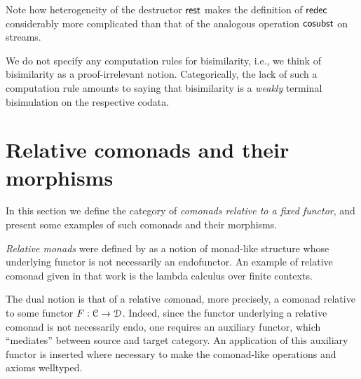 \documentclass[a4paper,USenglish]{lipics}
\begin{document}
\begin{Long}
Note how heterogeneity of the destructor $\mathsf{rest}$ makes the definition of $\mathsf{redec}$ considerably more complicated than that of
the analogous operation $\mathsf{cosubst}$ on streams.
\end{Long}

\begin{rem}
 We do not specify any computation rules for bisimilarity, i.e., we think of bisimilarity as a proof-irrelevant notion. 
 Categorically, the lack of such a computation rule amounts to saying that bisimilarity is a \emph{weakly} terminal bisimulation on the respective codata. 
\end{rem}


  
\section{Relative comonads and their morphisms}\label{sec:comonads}

In this section we define the category of \emph{comonads relative to a fixed functor}, and present some examples 
of such comonads and their morphisms.

\emph{Relative monads} were defined by \textcite{DBLP:conf/fossacs/AltenkirchCU10} as a notion of monad-like structure
whose underlying functor is not necessarily an endofunctor. 
An example of relative comonad given in that work is the lambda calculus over finite contexts.


The dual notion is that of a relative \emph{co}monad, more precisely, a comonad relative to some functor $F:{\mathcal{C}}\to\mathcal{D}$.
Indeed, since the functor underlying a relative comonad is not necessarily endo, one requires an auxiliary functor, which 
\enquote{mediates} between source and target category.
An application of this auxiliary functor is inserted where necessary to make the comonad-like operations and axioms welltyped.
\end{document}
